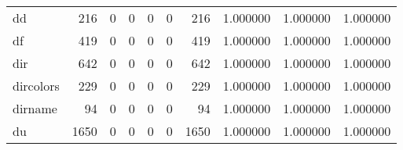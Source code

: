 \begin{longtable}{lrrrrrrrrr}
dd        &                                                216 &                                                  0 &                                                  0 &                                                  0 &                                                  0 &                                                216 &                                           1.000000 &                               1.000000 &                             1.000000 \\
df        &                                                419 &                                                  0 &                                                  0 &                                                  0 &                                                  0 &                                                419 &                                           1.000000 &                               1.000000 &                             1.000000 \\
dir       &                                                642 &                                                  0 &                                                  0 &                                                  0 &                                                  0 &                                                642 &                                           1.000000 &                               1.000000 &                             1.000000 \\
dircolors &                                                229 &                                                  0 &                                                  0 &                                                  0 &                                                  0 &                                                229 &                                           1.000000 &                               1.000000 &                             1.000000 \\
dirname   &                                                 94 &                                                  0 &                                                  0 &                                                  0 &                                                  0 &                                                 94 &                                           1.000000 &                               1.000000 &                             1.000000 \\
du        &                                               1650 &                                                  0 &                                                  0 &                                                  0 &                                                  0 &                                               1650 &                                           1.000000 &                               1.000000 &                             1.000000 \\

\end{longtable}
